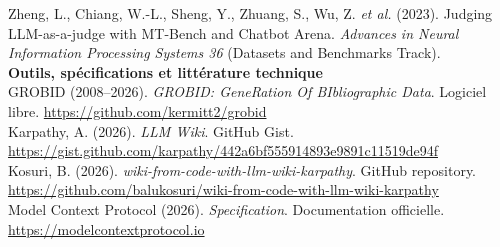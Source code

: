 \documentclass[11pt,a4paper]{article}
\begin{document}
{Zheng, L., Chiang, W.-L., Sheng, Y., Zhuang, S., Wu, Z. \textit{et al.} (2023). Judging LLM-as-a-judge with MT-Bench and Chatbot Arena. \textit{Advances in Neural Information Processing Systems 36} (Datasets and Benchmarks Track).\\[0.4cm]

\textbf{Outils, spécifications et littérature technique}\\[0.15cm]

GROBID (2008--2026). \textit{GROBID: GeneRation Of BIbliographic Data}. Logiciel libre. \url{https://github.com/kermitt2/grobid}\\[0.2cm]

Karpathy, A. (2026). \textit{LLM Wiki}. GitHub Gist. \url{https://gist.github.com/karpathy/442a6bf555914893e9891c11519de94f}\\[0.2cm]

Kosuri, B. (2026). \textit{wiki-from-code-with-llm-wiki-karpathy}. GitHub repository. \url{https://github.com/balukosuri/wiki-from-code-with-llm-wiki-karpathy}\\[0.2cm]

Model Context Protocol (2026). \textit{Specification}. Documentation officielle. \url{https://modelcontextprotocol.io}\\[0.2cm]

}
\end{document}
